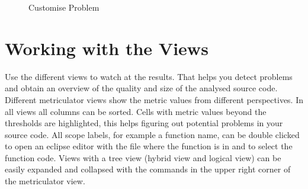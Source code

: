 \documentclass[11pt,a4paper,oneside]{scrreprt}
\begin{document}
\begin{enumerate}
\begin{figure}[th]
\begin{center}
\end{center}
\caption{Customise Problem}
\label{fig:problem}
\end{figure}
\end{enumerate}

\section{Working with the Views}\label{the_views}
Use the different views to watch at the results. That helps you detect problems and obtain an overview of the quality and size of the analysed source code. 
Different metriculator views show the metric values from different perspectives. In all views all columns can be sorted. Cells with metric values beyond the thresholds are highlighted, this helps figuring out potential problems in your source code. All scope labels, for example a function name, can be double clicked to open an eclipse editor with the file where the function is in and to select the function code. Views with a tree view (hybrid view and logical view) can be easily expanded and collapsed with the commands in the upper right corner of the metriculator view.
\end{document}
